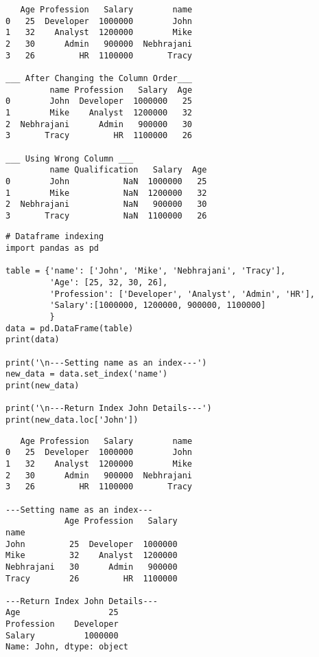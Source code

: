 \documentclass[11pt]{article}
\begin{document}
\begin{verbatim}
   Age Profession   Salary        name
0   25  Developer  1000000        John
1   32    Analyst  1200000        Mike
2   30      Admin   900000  Nebhrajani
3   26         HR  1100000       Tracy

___ After Changing the Column Order___
         name Profession   Salary  Age
0        John  Developer  1000000   25
1        Mike    Analyst  1200000   32
2  Nebhrajani      Admin   900000   30
3       Tracy         HR  1100000   26

___ Using Wrong Column ___
         name Qualification   Salary  Age
0        John           NaN  1000000   25
1        Mike           NaN  1200000   32
2  Nebhrajani           NaN   900000   30
3       Tracy           NaN  1100000   26
\end{verbatim}

\begin{verbatim}
# Dataframe indexing
import pandas as pd

table = {'name': ['John', 'Mike', 'Nebhrajani', 'Tracy'],
         'Age': [25, 32, 30, 26],
         'Profession': ['Developer', 'Analyst', 'Admin', 'HR'],
         'Salary':[1000000, 1200000, 900000, 1100000]
         }
data = pd.DataFrame(table)
print(data)

print('\n---Setting name as an index---')
new_data = data.set_index('name')
print(new_data)

print('\n---Return Index John Details---')
print(new_data.loc['John'])
\end{verbatim}

\begin{verbatim}
   Age Profession   Salary        name
0   25  Developer  1000000        John
1   32    Analyst  1200000        Mike
2   30      Admin   900000  Nebhrajani
3   26         HR  1100000       Tracy

---Setting name as an index---
            Age Profession   Salary
name
John         25  Developer  1000000
Mike         32    Analyst  1200000
Nebhrajani   30      Admin   900000
Tracy        26         HR  1100000

---Return Index John Details---
Age                  25
Profession    Developer
Salary          1000000
Name: John, dtype: object
\end{verbatim}
\end{document}
